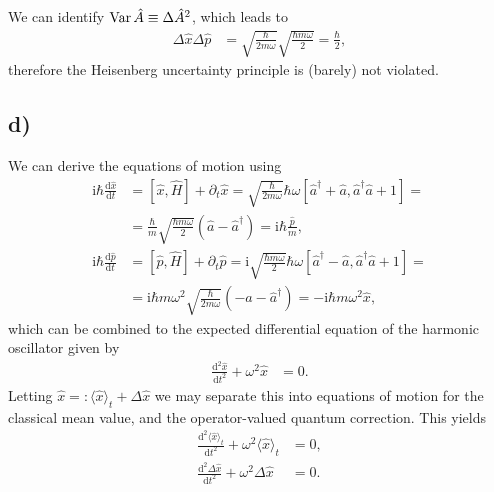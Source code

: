 \documentclass[english, parskip=full]{scrartcl}
\newcommand{\bra}{}
\newcommand{\kla}{}
\newcommand{\klam}{}
\newcommand{\tecxt}{}
\renewcommand{\i}{\text{i}}
\begin{document}
We can identify $\tecxt\text{Var\,}\hat{A}\equiv\Delta\hat{A}^2$, which leads to \begin{align}
\Delta\hat{x}\Delta\hat{p}&=\sqrt{\frac{\hbar}{2m\omega}}\sqrt{\frac{\hbar m\omega}{2}}=\frac{\hbar}{2},
\end{align}
therefore the Heisenberg uncertainty principle is (barely) not violated.
\subsection*{d)}
We can derive the equations of motion using
\begin{align}
\i\hbar\frac{\tecxt\text{d}\hat{x}}{\tecxt\text{d}t}&=\klam\left[ \hat{x},\hat{H} \right]+\partial_t\hat{x} = \sqrt{\frac{\hbar}{2m\omega}}\hbar\omega\klam\left[ \hat{a}^\dagger + \hat{a}, \hat{a}^\dagger\hat{a} + 1 \right]= \\
&= \frac{\hbar}{m}\sqrt{\frac{\hbar m\omega}{2}}\kla\left( \hat{a} - \hat{a}^\dagger  \right)=\i\hbar\frac{\hat{p}}{m},\\
\i\hbar\frac{\tecxt\text{d}\hat{p}}{\tecxt\text{d}t}&=\klam\left[ \hat{p},\hat{H} \right]+\partial_t\hat{p} = \i\sqrt{\frac{\hbar m\omega}{2}}\hbar\omega\klam\left[ \hat{a}^\dagger - \hat{a}, \hat{a}^\dagger\hat{a} + 1 \right]= \\
&= \i\hbar m\omega^2\sqrt{\frac{\hbar}{2 m\omega}}\kla\left( -\hat{a} - \hat{a}^\dagger  \right)=-\i\hbar m\omega^2\hat{x},
\end{align}
which can be combined to the expected differential equation of the harmonic oscillator given by
\begin{align}
\frac{\tecxt\text{d}^2\hat{x}}{\tecxt\text{d}t^2}+\omega^2\hat{x}&=0.
\end{align}
Letting $\hat{x}=:\bra\langle \hat{x} \rangle_t + \Delta\hat{x}$ we may separate this into equations of motion for the classical mean value, and the operator-valued quantum correction.
This yields
\begin{align}
\frac{\tecxt\text{d}^2\bra\langle \hat{x} \rangle_t}{\tecxt\text{d}t^2}+\omega^2\bra\langle \hat{x} \rangle_t&=0,\\
\frac{\tecxt\text{d}^2\Delta\hat{x}}{\tecxt\text{d}t^2}+\omega^2\Delta\hat{x}&=0.
\end{align}
\end{document}
